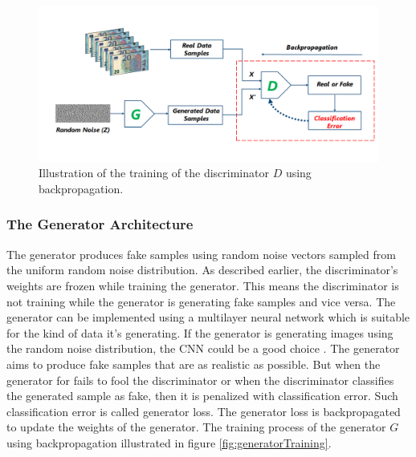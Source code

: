 \begin{figure}[H]
        \begin{center}
	    \includegraphics[scale=0.45]{images/Fundamentals/discriminatorTraining.png}
	    \caption[Illustration of the training of the discriminator $D$ using backpropagation.]{Illustration of the training of the discriminator $D$ using backpropagation.}
	    \label{fig:discriminatorTraining}
	    \end{center}
\end{figure}

\subsubsection{The Generator Architecture}\label{TheGeneratorSubSection}


The generator produces fake samples using random noise vectors sampled from the uniform random noise distribution. As described earlier, the discriminator's weights are frozen while training the generator. This means the discriminator is not training while the generator is generating fake samples and vice versa. The generator can be implemented using a multilayer neural network which is suitable for the kind of data it's generating. If the generator is generating images using the random noise distribution, the \ac{CNN} could be a good choice \cite{radford2016unsupervised}. The generator aims to produce fake samples that are as realistic as possible. But when the generator for fails to fool the discriminator or when the discriminator classifies the generated sample as fake, then it is penalized with classification error. Such classification error is called generator loss. The generator loss is backpropagated to update the weights of the generator. The training process of the generator $G$ using backpropagation illustrated in figure \ref{fig:generatorTraining}.

